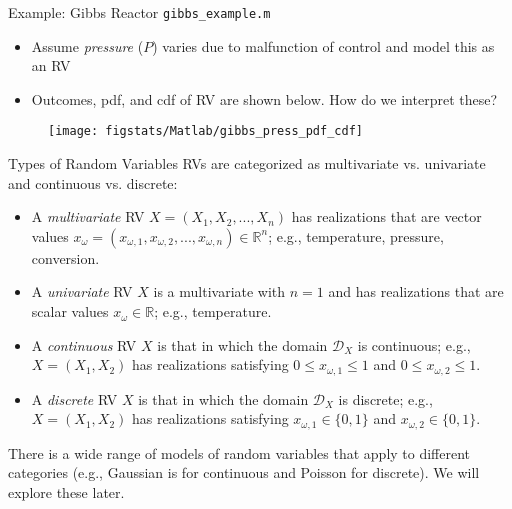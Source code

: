 \documentclass[9pt]{beamer}
\begin{document}
\begin{frame}{Example: Gibbs Reactor \footnotesize{\texttt{gibbs\_example.m}}}

\begin{itemize}
 \setlength{\itemsep}{10pt}
\item Assume {\em pressure} ($P$) varies due to malfunction of control and model this as an RV
\item Outcomes, pdf, and cdf of RV are shown below. How do we interpret these? 
\end{itemize}
\begin{figure}[!htb]
    \centering
	\texttt{[image: figstats/Matlab/gibbs\_press\_pdf\_cdf]}
\end{figure}

\end{frame}

\begin{frame}{Types of Random Variables}
RVs are categorized as multivariate vs. univariate and continuous vs. discrete:

\begin{block}{}
\begin{itemize}
 \setlength{\itemsep}{10pt}
\item A {\em multivariate} RV $X=(X_{1},X_{2},...,X_n)$ has realizations that are vector values $x_{\omega}=(x_{\omega,1},x_{\omega,2},...,x_{\omega,n})\in \mathbb{R}^n$; e.g., temperature, pressure, conversion.
\item A {\em univariate} RV $X$ is a multivariate with $n=1$ and has realizations that are scalar values $x_\omega\in \mathbb{R}$; e.g., temperature.
\item A {\em continuous} RV $X$ is that in which the domain $\mathcal{D}_X$ is continuous; e.g., $X=(X_1,X_2)$ has realizations satisfying $0\leq x_{\omega,1}\leq 1$ and $0\leq x_{\omega,2}\leq 1$.
\item A {\em discrete} RV $X$ is that in which the domain $\mathcal{D}_X$ is discrete; e.g., $X=(X_1,X_2)$ has realizations satisfying $x_{\omega,1}\in \{0,1\}$ and $x_{\omega,2}\in \{0,1\}$.
\end{itemize}
\end{block}
There is a wide range of models of random variables that apply to different categories (e.g., Gaussian is for continuous and Poisson for discrete). We will explore these later.  
\end{frame}
\end{document}
